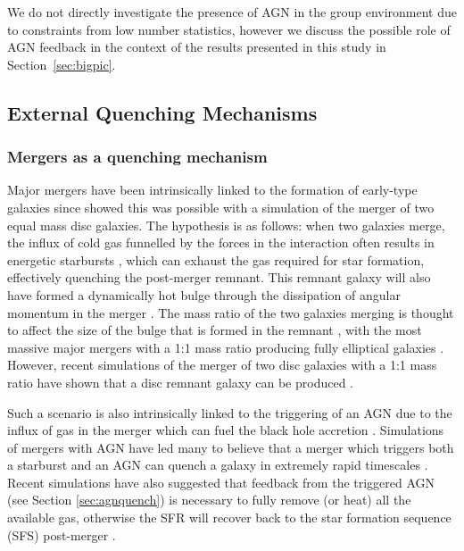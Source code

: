 \documentclass[useAMS,usenatbib]{mn2e}
\begin{document}
We do not directly investigate the presence of AGN in the group environment due to constraints from low number statistics, however we discuss the possible role of AGN feedback in the context of the results presented in this study in Section~\ref{sec:bigpic}.

 
\subsection{External Quenching Mechanisms}\label{sec:extquench}

\subsubsection{Mergers as a quenching mechanism}\label{sec:mergersquench}

Major mergers have been intrinsically linked to the formation of early-type galaxies since \citet{toomre72} showed this was possible with a simulation of the merger of two equal mass disc galaxies. The hypothesis is as follows: when two galaxies merge, the influx of cold gas funnelled by the forces in the interaction often results in energetic starbursts \citep{mihos94, mihos96, hopkins06d, hopkins08a, hopkins08b, snyder11, hayward14, sparre16}, which can exhaust the gas required for star formation, effectively quenching the post-merger remnant. This remnant galaxy will also have formed a dynamically hot bulge through the dissipation of angular momentum in the merger \citep{toomre77, walker96, kormendy04, hopkins11c, martig12}. The mass ratio of the two galaxies merging is thought to affect the size of the bulge that is formed in the remnant \citep{cox08, hopkins09c, tonini16}, with the most massive major mergers with a 1:1 mass ratio producing fully elliptical galaxies \citep{toomre72, barnes96, mihos96, kauffmann96, pontzen16}. However, recent simulations of the merger of two disc galaxies with a 1:1 mass ratio have shown that a disc remnant galaxy can be produced \citep{hopkins09c, pontzen16, sparre16}. 

Such a scenario is also intrinsically linked to the triggering of an AGN due to the influx of gas in the merger which can fuel the black hole accretion \citep{sanders88, dimatteo05, hopkins09a, treister12}. Simulations of mergers with AGN have led many to believe that a merger which triggers both a starburst and an AGN can quench a galaxy in extremely rapid timescales \citep{springel05b, bell06}. Recent simulations have also suggested that feedback from the triggered AGN (see Section \ref{sec:agnquench}) is necessary to fully remove (or heat) all the available gas, otherwise the SFR will recover back to the star formation sequence (SFS) post-merger \citep{athanassoula16, pontzen16, sparre16}. 
\end{document}
